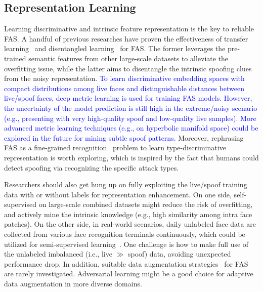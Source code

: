 \documentclass[10pt,journal,compsoc]{IEEEtran}
\begin{document}
\vspace{-0.3em}
\subsection{Representation Learning}
Learning discriminative and intrinsic feature representation is the key to reliable FAS. A handful of previous researches have proven the effectiveness of transfer learning~\cite{lucena2017transfer,parkin2019recognizing} and disentangled learning~\cite{zhang2020face,liu2020physics} for FAS. The former leverages the pre-trained semantic features from other large-scale datasets to alleviate the overfitting issue, while the latter aims to disentangle the intrinsic spoofing clues from the noisy representation. \textcolor{blue}{To learn discriminative embedding spaces with compact distributions among live faces and distinguishable distances between live/spoof faces, deep metric learning is used for training FAS models. However, the uncertainty of the model prediction is still high in the extreme/noisy scenario (e.g., presenting with very high-quality spoof and low-quality live samples). More advanced metric learning techniques (e.g., on hyperbolic manifold space) could be explored in the future for mining subtle spoof patterns.} Moreover, rephrasing FAS as a fine-grained recognition~\cite{yu2020face,wang2022patchnet} problem to learn type-discriminative representation is worth exploring, which is inspired by the fact that humans could detect spoofing via recognizing the specific attack types.  

Researchers should also get hung up on fully exploiting the live/spoof training data with or without labels for representation enhancement. On one side, self-supervised on large-scale combined datasets might reduce the risk of overfitting, and actively mine the intrinsic knowledge (e.g., high similarity among intra face patches). On the other side, in real-world scenarios, daily unlabeled face data are collected from various face recognition terminals continuously, which could be utilized for semi-supervised learning~\cite{quan2021progressive}. One challenge is how to make full use of the unlabeled imbalanced (i.e., live $\gg$ spoof) data, avoiding unexpected performance drop. In addition, suitable data augmentation strategies~\cite{yu2021dual} for FAS are rarely investigated. Adversarial learning might be a good choice for adaptive data augmentation in more diverse domains.        
\end{document}
